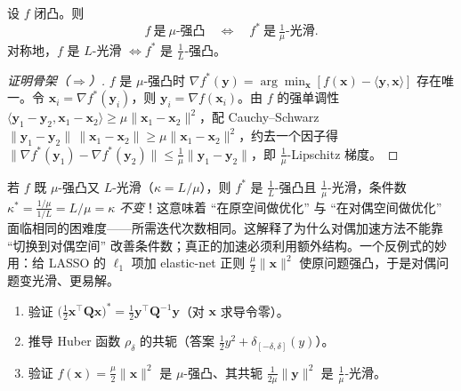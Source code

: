 \begin{theorem}[强凸--光滑对偶]\label{thm:strong-smooth-dual}
设 $f$ 闭凸。则
\begin{equation}
  f\ \text{是}\ \mu\text{-强凸}\quad\Longleftrightarrow\quad f^\ast\ \text{是}\ \tfrac1\mu\text{-光滑}.
  \label{eq:strong-smooth-dual}
\end{equation}
对称地，$f$ 是 $L$-光滑 $\iff f^\ast$ 是 $\tfrac1L$-强凸。
\end{theorem}
\begin{proof}[证明骨架（$\Rightarrow$）]
$f$ 是 $\mu$-强凸时 $\nabla f^\ast(\mathbf y)=\arg\min_{\mathbf x}[f(\mathbf x)-\langle\mathbf y,\mathbf x\rangle]$ 存在唯一。令 $\mathbf x_i=\nabla f^\ast(\mathbf y_i)$，则 $\mathbf y_i=\nabla f(\mathbf x_i)$。由 $f$ 的强单调性 $\langle\mathbf y_1-\mathbf y_2,\mathbf x_1-\mathbf x_2\rangle\ge\mu\|\mathbf x_1-\mathbf x_2\|^2$，配 Cauchy--Schwarz $\|\mathbf y_1-\mathbf y_2\|\,\|\mathbf x_1-\mathbf x_2\|\ge\mu\|\mathbf x_1-\mathbf x_2\|^2$，约去一个因子得 $\|\nabla f^\ast(\mathbf y_1)-\nabla f^\ast(\mathbf y_2)\|\le\tfrac1\mu\|\mathbf y_1-\mathbf y_2\|$，即 $\tfrac1\mu$-Lipschitz 梯度。
\end{proof}

\begin{insight}[条件数在共轭下不变]\label{ins:condition-invariant}
若 $f$ 既 $\mu$-强凸又 $L$-光滑（$\kappa=L/\mu$），则 $f^\ast$ 是 $\tfrac1L$-强凸且 $\tfrac1\mu$-光滑，条件数 $\kappa^\ast=\tfrac{1/\mu}{1/L}=L/\mu=\kappa$ \emph{不变}！这意味着 “在原空间做优化” 与 “在对偶空间做优化” 面临相同的困难度——所需迭代次数相同。这解释了为什么对偶加速方法不能靠 “切换到对偶空间” 改善条件数；真正的加速必须利用额外结构。一个反例式的妙用：给 LASSO 的 $\ell_1$ 项加 elastic-net 正则 $\tfrac\mu2\|\mathbf x\|^2$ 使原问题强凸，于是对偶问题变光滑、更易解。
\end{insight}

\begin{practice}
\begin{enumerate}
  \item 验证 $\big(\tfrac12\mathbf x^\top\mathbf Q\mathbf x\big)^\ast=\tfrac12\mathbf y^\top\mathbf Q^{-1}\mathbf y$（对 $\mathbf x$ 求导令零）。
  \item 推导 Huber 函数 $\rho_\delta$ 的共轭（答案 $\tfrac12 y^2+\delta_{[-\delta,\delta]}(y)$）。
  \item 验证 $f(\mathbf x)=\tfrac\mu2\|\mathbf x\|^2$ 是 $\mu$-强凸、其共轭 $\tfrac1{2\mu}\|\mathbf y\|^2$ 是 $\tfrac1\mu$-光滑。
\end{enumerate}
\end{practice}

